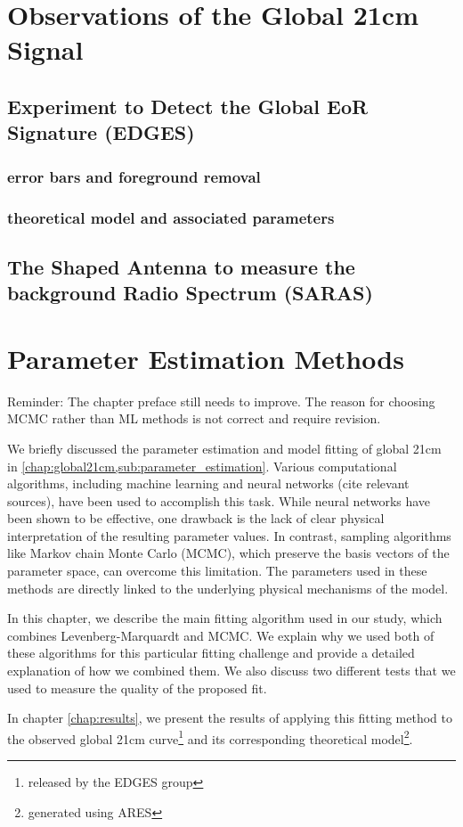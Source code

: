 \documentclass[12pt, TexShade, letterpaper]{report}
\begin{document}
\chapter{Observations of the Global 21cm Signal}
\label{chap:observations}
\section{Experiment to Detect the Global EoR Signature (EDGES)}
\subsection{error bars and foreground removal}
\subsection{theoretical model and associated parameters}
\section{The Shaped Antenna to measure the background Radio Spectrum (SARAS)}
\chapter{Parameter Estimation Methods}
\label{chap:param_estimate}
Reminder: The chapter preface still needs to improve. The reason for choosing MCMC rather than ML methods is not correct and require revision. \par
We briefly discussed the parameter estimation and model fitting of global 21cm in \ref{chap:global21cm,sub:parameter_estimation}. Various computational algorithms, including machine learning and neural networks (cite relevant sources), have been used to accomplish this task. While neural networks have been shown to be effective, one drawback is the lack of clear physical interpretation of the resulting parameter values. In contrast, sampling algorithms like Markov chain Monte Carlo (MCMC), which preserve the basis vectors of the parameter space, can overcome this limitation. The parameters used in these methods are directly linked to the underlying physical mechanisms of the model.\par
In this chapter, we describe the main fitting algorithm used in our study, which combines Levenberg-Marquardt and MCMC. We explain why we used both of these algorithms for this particular fitting challenge and provide a detailed explanation of how we combined them. We also discuss two different tests that we used to measure the quality of the proposed fit.\par
In chapter \ref{chap:results}, we present the results of applying this fitting method to the observed global 21cm curve\footnote{released by the EDGES group} and its corresponding theoretical model\footnote{generated using ARES}.
\end{document}
